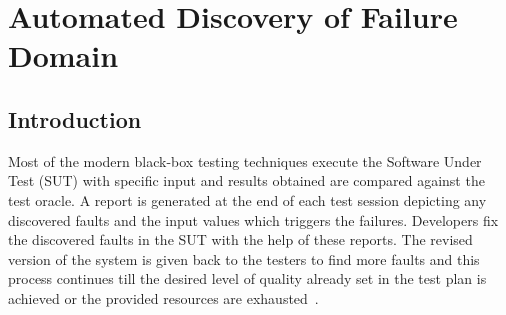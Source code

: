 
\chapter{Automated Discovery of Failure Domain}
\label{chap:ADFD}

\section{Introduction}\label{sec:intro5}
Most of the modern black-box testing techniques execute the Software Under Test (SUT) with specific input and results obtained are compared against the test oracle. A report is generated at the end of each test session depicting any discovered faults and the input values which triggers the failures. Developers fix the discovered faults in the SUT with the help of these reports. The revised version of the system is given back to the testers to find more faults and this process continues till the desired level of quality already set in the test plan is achieved or the provided resources are exhausted~\cite{parnin2011automated}.


